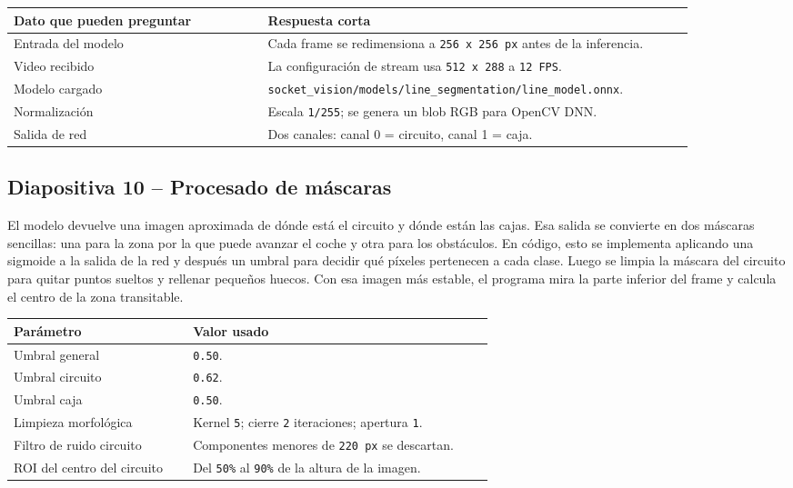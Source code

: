 \documentclass[a4paper,11pt]{article}
\begin{document}
\begin{center}
\centering
\footnotesize
\begin{tabular}{@{}L{0.34\linewidth}L{0.58\linewidth}@{}}
\toprule
\textbf{Dato que pueden preguntar} & \textbf{Respuesta corta} \\
\midrule
Entrada del modelo & Cada frame se redimensiona a \texttt{256 x 256 px} antes de la inferencia. \\
Video recibido & La configuraci\'on de stream usa \texttt{512 x 288} a \texttt{12 FPS}. \\
Modelo cargado & \texttt{socket\_vision/models/line\_segmentation/line\_model.onnx}. \\
Normalizaci\'on & Escala \texttt{1/255}; se genera un blob RGB para OpenCV DNN. \\
Salida de red & Dos canales: canal 0 = circuito, canal 1 = caja. \\
\bottomrule
\end{tabular}
\end{center}

\subsection*{Diapositiva 10 -- Procesado de m\'ascaras}
El modelo devuelve una imagen aproximada de d\'onde est\'a el circuito y d\'onde est\'an las cajas. Esa salida se convierte en dos m\'ascaras sencillas: una para la zona por la que puede avanzar el coche y otra para los obst\'aculos. En c\'odigo, esto se implementa aplicando una sigmoide a la salida de la red y despu\'es un umbral para decidir qu\'e p\'ixeles pertenecen a cada clase. Luego se limpia la m\'ascara del circuito para quitar puntos sueltos y rellenar peque\~nos huecos. Con esa imagen m\'as estable, el programa mira la parte inferior del frame y calcula el centro de la zona transitable.

\begin{center}
\centering
\footnotesize
\begin{tabular}{@{}L{0.34\linewidth}L{0.58\linewidth}@{}}
\toprule
\textbf{Par\'ametro} & \textbf{Valor usado} \\
\midrule
Umbral general & \texttt{0.50}. \\
Umbral circuito & \texttt{0.62}. \\
Umbral caja & \texttt{0.50}. \\
Limpieza morfol\'ogica & Kernel \texttt{5}; cierre \texttt{2} iteraciones; apertura \texttt{1}. \\
Filtro de ruido circuito & Componentes menores de \texttt{220 px} se descartan. \\
ROI del centro del circuito & Del \texttt{50\%} al \texttt{90\%} de la altura de la imagen. \\
\bottomrule
\end{tabular}
\end{center}
\end{document}
